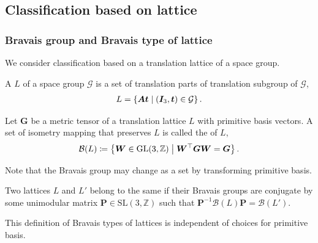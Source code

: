 \subsection{\label{sec:bravais-class}Classification based on lattice}

\subsubsection{Bravais group and Bravais type of lattice}

We consider classification based on a translation lattice of a space group.

\begin{screen}
  \begin{defn}
    A  $L$ of a space group $\mathcal{G}$ is a set of translation parts of translation subgroup of $\mathcal{G}$,
    \begin{align}
      L = \left\{  \bm{At}  \mathrel{}\middle|\mathrel{}  (\bm{I}_{3}, \bm{t}) \in \mathcal{G}  \right\}.
    \end{align}
  \end{defn}
\end{screen}

\begin{screen}
  \begin{defn}
    Let $\bm{G}$ be a metric tensor of a translation lattice $L$ with primitive basis vectors.
    A set of isometry mapping that preserves $L$ is called the  of $L$,
    \begin{align}
      \mathcal{B}(L) \coloneqq \left\{  \bm{W} \in \mathrm{GL}(3, \mathbb{Z})  \mathrel{}\middle|\mathrel{}  \bm{W}^{\top}\bm{GW} = \bm{G}  \right\}.
    \end{align}
  \end{defn}
\end{screen}

Note that the Bravais group may change as a set by transforming primitive basis.

\begin{screen}
  \begin{defn}
    Two lattices $L$ and $L'$ belong to the same  if their Bravais groups are conjugate by some unimodular matrix $\bm{P} \in \mathrm{SL}(3, \mathbb{Z})$ such that $\bm{P}^{-1} \mathcal{B}(L) \bm{P} = \mathcal{B}(L')$.
  \end{defn}
\end{screen}
This definition of Bravais types of lattices is independent of choices for primitive basis.

